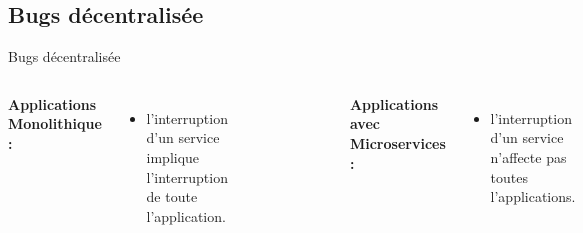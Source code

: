 \documentclass{beamer}
\begin{document}
\subsection{Bugs d\'ecentralis\'ee}
\begin{frame}{Bugs d\'ecentralis\'ee}
    \begin{columns}
        \textbf{Applications Monolithique :} 
                \begin{itemize}
                    \item l'interruption d'un service implique l'interruption de toute l'application.
                \end{itemize}
        \begin{figure}
            \begin{center}
            \includegraphics[width=0.8\textwidth]{BUGmono.png}
            \end{center}
        \end{figure}
        \pause
        \textbf{Applications avec Microservices :}
         \begin{itemize}
                    \item l'interruption d'un service n'affecte pas toutes l'applications.
                \end{itemize}
        \begin{figure}
            \begin{center}
            \includegraphics[width=0.8\textwidth]{BUGMicroservices.png}
            \end{center}
        \end{figure}
        


\end{columns}
\end{frame}
\end{document}
